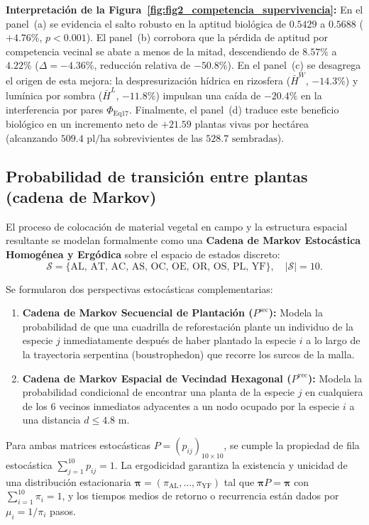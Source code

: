 \documentclass[11pt,a4paper]{article}
\begin{document}
\textbf{Interpretación de la Figura~\ref{fig:fig2_competencia_supervivencia}:} En el panel~(a) se evidencia el salto robusto en la aptitud biológica de $0.5429$ a $0.5688$ ($+4.76\%$, $p < 0.001$). El panel~(b) corrobora que la pérdida de aptitud por competencia vecinal se abate a menos de la mitad, descendiendo de $8.57\%$ a $4.22\%$ ($\Delta = -4.36\%$, reducción relativa de $-50.8\%$). En el panel~(c) se desagrega el origen de esta mejora: la despresurización hídrica en rizosfera ($\bar{H}^W$, $-14.3\%$) y lumínica por sombra ($\bar{H}^L$, $-11.8\%$) impulsan una caída de $-20.4\%$ en la interferencia por pares $\Phi_{\text{Eq17}}$. Finalmente, el panel~(d) traduce este beneficio biológico en un incremento neto de $+21.59$ plantas vivas por hectárea (alcanzando $509.4\text{ pl/ha}$ sobrevivientes de las $528.7\text{ sembradas}$).

\subsection{Probabilidad de transición entre plantas (cadena de Markov)}
El proceso de colocación de material vegetal en campo y la estructura espacial resultante se modelan formalmente como una \textbf{Cadena de Markov Estocástica Homogénea y Ergódica} sobre el espacio de estados discreto:
\begin{equation}
\mathcal{S} = \{\text{AL, AT, AC, AS, OC, OE, OR, OS, PL, YF}\}, \quad |\mathcal{S}| = 10.
\end{equation}

Se formularon dos perspectivas estocásticas complementarias:
\begin{enumerate}[leftmargin=1.5em]
    \item \textbf{Cadena de Markov Secuencial de Plantación ($P^{\text{sec}}$):} Modela la probabilidad de que una cuadrilla de reforestación plante un individuo de la especie $j$ inmediatamente después de haber plantado la especie $i$ a lo largo de la trayectoria serpentina (boustrophedon) que recorre los surcos de la malla.
    \item \textbf{Cadena de Markov Espacial de Vecindad Hexagonal ($P^{\text{vec}}$):} Modela la probabilidad condicional de encontrar una planta de la especie $j$ en cualquiera de los 6 vecinos inmediatos adyacentes a un nodo ocupado por la especie $i$ a una distancia $d \le 4.8\text{ m}$.
\end{enumerate}

Para ambas matrices estocásticas $P = (p_{ij})_{10\times 10}$, se cumple la propiedad de fila estocástica $\sum_{j=1}^{10} p_{ij} = 1$. La ergodicidad garantiza la existencia y unicidad de una distribución estacionaria $\boldsymbol{\pi} = (\pi_{\text{AL}}, \dots, \pi_{\text{YF}})$ tal que $\boldsymbol{\pi} P = \boldsymbol{\pi}$ con $\sum_{i=1}^{10} \pi_i = 1$, y los tiempos medios de retorno o recurrencia están dados por $\mu_i = 1 / \pi_i$ pasos.
\end{document}
